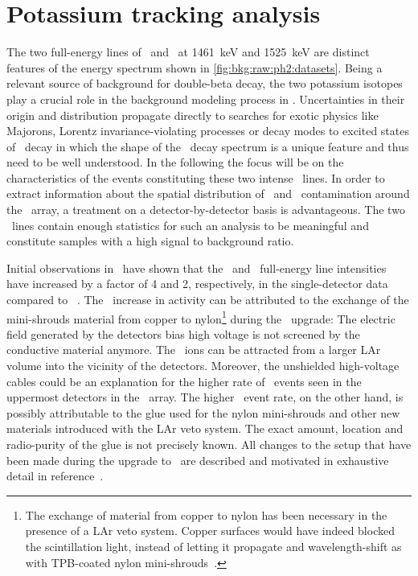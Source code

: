 \begin{table}
\centering
  \caption{%
    Fit results of the \a\ events background analysis for the
    \enrBEGeII\ and \enrCoaxII\ data sets. Values are given in counts in the
    full pdf range from 40~keV to 8000~keV.
  }\label{tab:bkg:raw:ph2:amodel:results}
  
\end{table}

\section{Potassium tracking analysis}%
\label{sec:bkg:raw:ph2:kmodel}

The two full-energy lines of \kvn\ and \kvz\ at 1461~keV and 1525~keV are distinct
features of the energy spectrum shown in \cref{fig:bkg:raw:ph2:datasets}. Being a relevant
source of background for double-beta decay, the two potassium isotopes play a crucial role
in the background modeling process in \gerda. Uncertainties in their origin and
distribution propagate directly to searches for exotic physics like Majorons, Lorentz
invariance-violating processes or decay modes to excited states of \nnbb\ decay in which
the shape of the \nnbb\ decay spectrum is a unique feature and thus need to be well
understood. In the following the focus will be on the characteristics of the events
constituting these two intense \g\ lines. In order to extract information about the
spatial distribution of \kvn\ and \kvz\ contamination around the \gerda\ array, a
treatment on a detector-by-detector basis is advantageous. The two \g\ lines contain
enough statistics for such an analysis to be meaningful and constitute samples with a high
signal to background ratio.

Initial observations in \phasetwo\ have shown that the \kvn\ and \kvz\ full-energy line
intensities have increased by a factor of 4 and 2, respectively, in the single-detector
data compared to \phaseone~\cite{DAndrea2017}. The \kvz\ increase in activity can be
attributed to the exchange of the mini-shrouds material from copper to nylon\footnote{%
  The exchange of material from copper to nylon has been necessary in the presence of a
  LAr veto system. Copper surfaces would have indeed blocked the scintillation light,
  instead of letting it propagate and wavelength-shift as with TPB-coated nylon
  mini-shrouds~\cite{Lubashevskiy2017}.
} during the \phasetwo\ upgrade: The electric field generated by the detectors bias high
voltage is not screened by the conductive material anymore. The \kvz\ ions can be
attracted from a larger LAr volume into the vicinity of the detectors.  Moreover, the
unshielded high-voltage cables could be an explanation for the higher rate of \kvz\ events
seen in the uppermost detectors in the \gerda\ array. The higher \kvn\ event rate, on the
other hand, is possibly attributable to the glue used for the nylon mini-shrouds and other
new materials introduced with the LAr veto system. The exact amount, location and
radio-purity of the glue is not precisely known.  All changes to the setup that have been
made during the upgrade to \phasetwo\ are described and motivated in exhaustive detail in
reference~\cite{Agostini2018a}.

